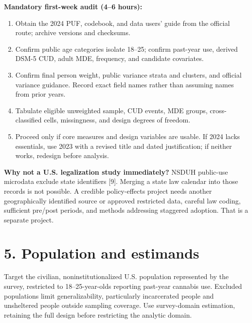 \documentclass[10pt]{article}
\newcommand{\head}[1]{\section*{\color{navy}#1}}
\begin{document}
\textbf{Mandatory first-week audit (4--6 hours):}
\begin{enumerate}
\item Obtain the 2024 PUF, codebook, and data users' guide from the official route; archive versions and checksums.
\item Confirm public age categories isolate 18--25; confirm past-year use, derived DSM-5 CUD, adult MDE, frequency, and candidate covariates.
\item Confirm final person weight, public variance strata and clusters, and official variance guidance. Record exact field names rather than assuming names from prior years.
\item Tabulate eligible unweighted sample, CUD events, MDE groups, cross-classified cells, missingness, and design degrees of freedom.
\item Proceed only if core measures and design variables are usable. If 2024 lacks essentials, use 2023 with a revised title and dated justification; if neither works, redesign before analysis.
\end{enumerate}

\textbf{Why not a U.S. legalization study immediately?} NSDUH public-use microdata exclude state identifiers [9]. Merging a state law calendar into those records is not possible. A credible policy-effects project needs another geographically identified source or approved restricted data, careful law coding, sufficient pre/post periods, and methods addressing staggered adoption. That is a separate project.
\head{5. Population and estimands}
Target the civilian, noninstitutionalized U.S. population represented by the survey, restricted to 18--25-year-olds reporting past-year cannabis use. Excluded populations limit generalizability, particularly incarcerated people and unsheltered people outside sampling coverage. Use survey-domain estimation, retaining the full design before restricting the analytic domain.
\end{document}
